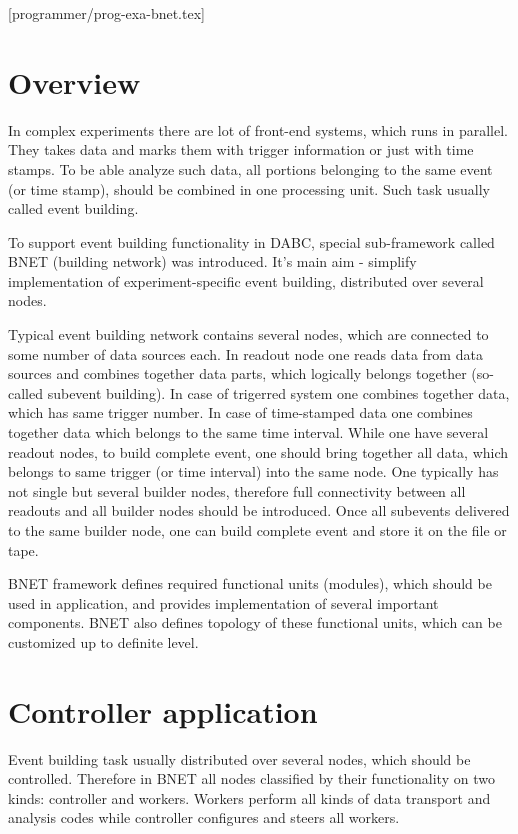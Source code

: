 [programmer/prog-exa-bnet.tex]

\section{Overview}

In complex experiments there are lot of front-end systems, which runs in parallel.
They takes data and marks them with trigger information or just with time stamps.
To be able analyze such data, all portions belonging to the same event (or time stamp),   
should be combined in one processing unit. Such task usually called event building.

To support event building functionality in DABC, special sub-framework called 
BNET (building network) was introduced. 
It's main aim - simplify implementation of experiment-specific event building, 
distributed over several nodes.

Typical event building network contains several  nodes, 
which are connected to some number of data sources each.
In readout node one reads data from data sources and combines
together data parts, which logically belongs together (so-called subevent building).
In case of trigerred system one combines together data, which has same trigger number.
In case of time-stamped data one combines together data which belongs to the same 
time interval. While one have several readout nodes, to build complete event, one
should bring together all data, which belongs to same trigger (or time interval) into
the same  node. 
One typically has not single but several builder nodes, therefore
full connectivity between all readouts and all builder nodes should be introduced.
Once all subevents delivered to the same builder node, one can build complete event 
and store it on the file or tape. 


BNET framework defines required functional units (modules), 
which should be used in application, 
and provides implementation of several important components.
BNET also defines topology of these functional units, which can be customized up
to definite level.


\section{Controller application}

Event building task usually distributed over several nodes, 
which should be controlled.
Therefore in BNET all nodes classified by their functionality on two kinds: controller and
workers. Workers perform all kinds of data transport and analysis codes while controller 
configures and steers all workers. 

